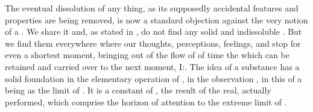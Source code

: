 The eventual dissolution of any thing, as its supposedly accidental features and
properties are being removed, is now a standard objection against the very
notion of a .  We share it and, as stated in
, do not find  any solid and indissoluble
. But we find them everywhere where our thoughts, perceptions,
feelings,  and  stop for even a shortest moment,
bringing out of the  flow of  of time the
 which can be retained and carried over to the next
moment, I:.  The idea of a substance has a solid foundation
in the elementary operation of , in the observation , in this  of a being as the limit of
. It is a constant  of , the result
of the real, actually performed,  which comprise the horizon of
attention to the extreme limit of .

